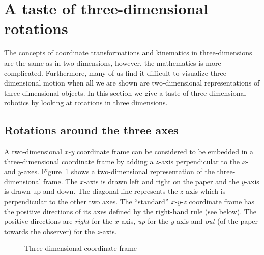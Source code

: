 
\section{A taste of three-dimensional rotations}\label{s.three}


The concepts of coordinate transformations and kinematics in three-dimensions are the same as in two dimensions, however, the mathematics is more complicated. Furthermore, many of us find it difficult to visualize three-dimensional motion when all we are shown are two-dimensional representations of three-dimensional objects. In this section we give a taste of three-dimensional robotics by looking at rotations in three dimensions.

\subsection{Rotations around the three axes}\label{s.rotation-notation}

A two-dimensional $x$-$y$ coordinate frame can be considered to be embedded in a three-dimensional coordinate frame by adding a $z$-axis perpendicular to the $x$- and $y$-axes. Figure~\ref{fig.frame} shows a two-dimensional representation of the three-dimensional frame. The $x$-axis is drawn left and right on the paper and the $y$-axis is drawn up and down. The diagonal line represents the $z$-axis which is perpendicular to the other two axes. The ``standard'' $x$-$y$-$z$ coordinate frame has the positive directions of its axes defined by the right-hand rule (see below). The positive directions are \textit{right} for the $x$-axis, \textit{up} for the $y$-axis and \textit{out} (of the paper towards the observer) for the $z$-axis. 

\begin{figure}
\begin{center}
\caption{Three-dimensional coordinate frame}\label{fig.frame}
\end{center}
\end{figure}

